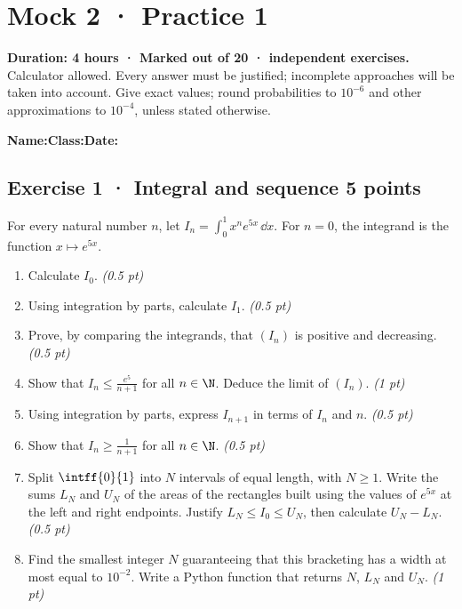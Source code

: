 \mxnewpage{}\label{sujet:8-1}

\section*{Mock 2 · Practice 1}


\textbf{Duration: 4 hours · Marked out of 20 ·  independent exercises.}\\Calculator allowed. Every answer must be justified; incomplete approaches will be taken into account. Give exact values; round probabilities to $10^{-6}$ and other approximations to $10^{-4}$, unless stated otherwise.

\smallskip\textbf{Name:}\enspace\dotfill\quad\textbf{Class:}\enspace\dotfill\quad\textbf{Date:}\enspace\dotfill

\subsection*{Exercise 1 · Integral and sequence \hfill 5 points}For every natural number $n$, let $I_n=\displaystyle\int_0^1x^ne^{5x}\,\dd x$. For $n=0$, the integrand is the function $x\mapsto e^{5x}$.

\begin{enumerate}

\item Calculate $I_0$. \hfill\textit{(0.5 pt)}

\item Using integration by parts, calculate $I_1$. \hfill\textit{(0.5 pt)}

\item Prove, by comparing the integrands, that $(I_n)$ is positive and decreasing. \hfill\textit{(0.5 pt)}

\item Show that $I_n\le\frac{e^{5}}{n+1}$ for all $n\in\N$. Deduce the limit of $(I_n)$. \hfill\textit{(1 pt)}

\item Using integration by parts, express $I_{n+1}$ in terms of $I_n$ and $n$. \hfill\textit{(0.5 pt)}

\item Show that $I_n\ge\frac1{n+1}$ for all $n\in\N$. \hfill\textit{(0.5 pt)}

\item Split $\intff{0}{1}$ into $N$ intervals of equal length, with $N\ge1$. Write the sums $L_N$ and $U_N$ of the areas of the rectangles built using the values of $e^{5x}$ at the left and right endpoints. Justify $L_N\le I_0\le U_N$, then calculate $U_N-L_N$. \hfill\textit{(0.5 pt)}

\item Find the smallest integer $N$ guaranteeing that this bracketing has a width at most equal to $10^{-2}$. Write a Python function that returns $N$, $L_N$ and $U_N$. \hfill\textit{(1 pt)}

\end{enumerate}

